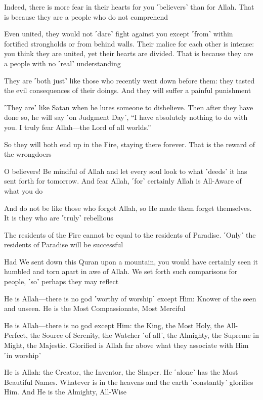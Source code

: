 Indeed, there is more fear in their hearts for you ˹believers˺ than for Allah. That is because they are a people who do not comprehend

Even united, they would not ˹dare˺ fight against you except ˹from˺ within fortified strongholds or from behind walls. Their malice for each other is intense: you think they are united, yet their hearts are divided. That is because they are a people with no ˹real˺ understanding

They are ˹both just˺ like those who recently went down before them: they tasted the evil consequences of their doings. And they will suffer a painful punishment

˹They are˺ like Satan when he lures someone to disbelieve. Then after they have done so, he will say ˹on Judgment Day˺, “I have absolutely nothing to do with you. I truly fear Allah—the Lord of all worlds.”

So they will both end up in the Fire, staying there forever. That is the reward of the wrongdoers

O believers! Be mindful of Allah and let every soul look to what ˹deeds˺ it has sent forth for tomorrow. And fear Allah, ˹for˺ certainly Allah is All-Aware of what you do

And do not be like those who forgot Allah, so He made them forget themselves. It is they who are ˹truly˺ rebellious

The residents of the Fire cannot be equal to the residents of Paradise. ˹Only˺ the residents of Paradise will be successful

Had We sent down this Quran upon a mountain, you would have certainly seen it humbled and torn apart in awe of Allah. We set forth such comparisons for people, ˹so˺ perhaps they may reflect

He is Allah—there is no god ˹worthy of worship˺ except Him: Knower of the seen and unseen. He is the Most Compassionate, Most Merciful

He is Allah—there is no god except Him: the King, the Most Holy, the All-Perfect, the Source of Serenity, the Watcher ˹of all˺, the Almighty, the Supreme in Might, the Majestic. Glorified is Allah far above what they associate with Him ˹in worship˺

He is Allah: the Creator, the Inventor, the Shaper. He ˹alone˺ has the Most Beautiful Names. Whatever is in the heavens and the earth ˹constantly˺ glorifies Him. And He is the Almighty, All-Wise

